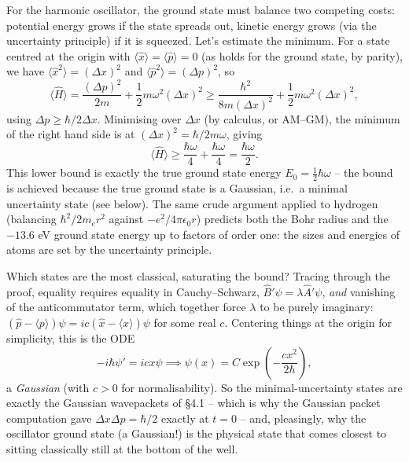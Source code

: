 \begin{example}
    For the harmonic oscillator, the ground state must balance two competing costs: potential energy grows if the state spreads out, kinetic energy grows (via the uncertainty principle) if it is squeezed. Let's estimate the minimum. For a state centred at the origin with $\langle \hat x \rangle = \langle \hat p \rangle = 0$ (as holds for the ground state, by parity), we have $\langle \hat{x}^2 \rangle = (\Delta x)^2$ and $\langle \hat{p}^2 \rangle = (\Delta p)^2$, so
    $$
    \langle \hat{H} \rangle = \frac{(\Delta p)^2}{2m} + \frac{1}{2} m \omega^2 (\Delta x)^2
    \geq \frac{\hbar^2}{8 m (\Delta x)^2} + \frac{1}{2} m \omega^2 (\Delta x)^2,
    $$
    using $\Delta p \geq \hbar / 2 \Delta x$. Minimising over $\Delta x$ (by calculus, or AM--GM), the minimum of the right hand side is at $(\Delta x)^2 = \hbar/2m\omega$, giving
    $$
    \langle \hat{H} \rangle \geq \frac{\hbar \omega}{4} + \frac{\hbar \omega}{4} = \frac{\hbar \omega}{2}.
    $$
    This lower bound is exactly the true ground state energy $E_0 = \frac{1}{2}\hbar\omega$ -- the bound is achieved because the true ground state is a Gaussian, i.e.\ a minimal uncertainty state (see below). The same crude argument applied to hydrogen (balancing $\hbar^2/2m_e r^2$ against $-e^2/4\pi\epsilon_0 r$) predicts both the Bohr radius and the $-13.6$ eV ground state energy up to factors of order one: the sizes and energies of atoms are set by the uncertainty principle.
\end{example}

Which states are the most classical, saturating the bound? Tracing through the proof, equality requires equality in Cauchy--Schwarz, $\hat{B}'\psi = \lambda \hat{A}'\psi$, \emph{and} vanishing of the anticommutator term, which together force $\lambda$ to be purely imaginary: $(\hat{p} - \langle p \rangle)\psi = i c (\hat{x} - \langle x \rangle)\psi$ for some real $c$. Centering things at the origin for simplicity, this is the ODE
$$
-i\hbar \psi' = i c x \psi \implies \psi(x) = C \exp\left(-\frac{c x^2}{2\hbar}\right),
$$
a \emph{Gaussian} (with $c > 0$ for normalisability). So the minimal-uncertainty states are exactly the Gaussian wavepackets of \S 4.1 -- which is why the Gaussian packet computation gave $\Delta x \Delta p = \hbar/2$ exactly at $t = 0$ -- and, pleasingly, why the oscillator ground state (a Gaussian!) is the physical state that comes closest to sitting classically still at the bottom of the well.

